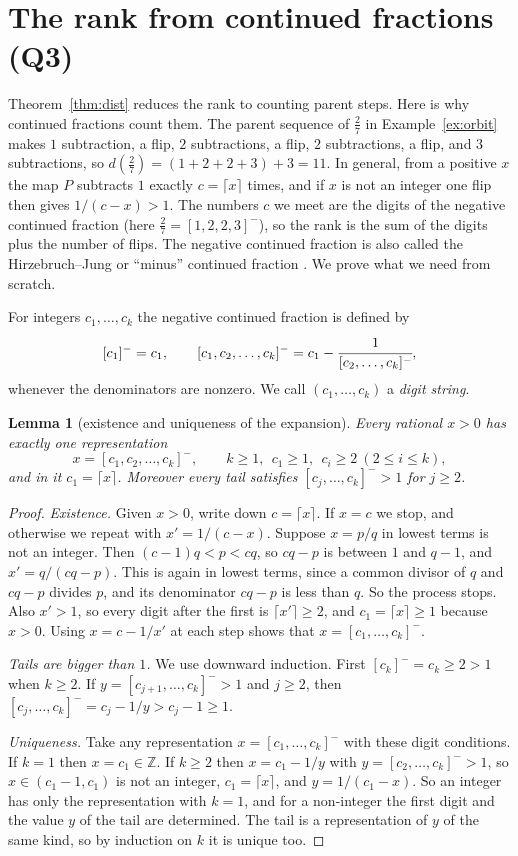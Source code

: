 \documentclass[11pt]{article}
\newtheorem{lemma}[theorem]{Lemma}
\theoremstyle{definition}
\theoremstyle{remark}
\newcommand{\Z}{\mathbb{Z}}
\newcommand{\hj}[1]{[#1]^{-}}                 %
\begin{document}
\section{The rank from continued fractions (Q3)}\label{sec:cf}

Theorem~\ref{thm:dist} reduces the rank to counting parent steps. Here is why continued fractions
count them. The parent sequence of $\tfrac27$ in Example~\ref{ex:orbit} makes $1$ subtraction, a
flip, $2$ subtractions, a flip, $2$ subtractions, a flip, and $3$ subtractions, so
$d(\tfrac27)=(1+2+2+3)+3=11$. In general, from a positive $x$ the map $P$ subtracts $1$ exactly
$c=\lceil x\rceil$ times, and if $x$ is not an integer one flip then gives $1/(c-x)>1$. The numbers
$c$ we meet are the digits of the negative continued fraction (here $\tfrac27=\hj{1,2,2,3}$), so
the rank is the sum of the digits plus the number of flips. The negative continued fraction is also
called the Hirzebruch--Jung or ``minus'' continued fraction \cite{hirzebruch1953,popescu2007}. We
prove what we need from scratch.

For integers $c_1,\dots,c_k$ the negative continued fraction is defined by
\[
\hj{c_1}=c_1, \qquad
\hj{c_1,c_2,\dots,c_k}=c_1-\cfrac{1}{\hj{c_2,\dots,c_k}} ,
\]
whenever the denominators are nonzero. We call $(c_1,\dots,c_k)$ a \emph{digit string}.

\begin{lemma}[existence and uniqueness of the expansion]\label{lem:hjexist}
Every rational $x>0$ has exactly one representation
\[
x=\hj{c_1,c_2,\dots,c_k},\qquad k\ge1,\ \ c_1\ge1,\ \ c_i\ge2\ (2\le i\le k),
\]
and in it $c_1=\lceil x\rceil$. Moreover every tail satisfies $\hj{c_j,\dots,c_k}>1$ for $j\ge2$.
\end{lemma}

\begin{proof}
\emph{Existence.} Given $x>0$, write down $c=\lceil x\rceil$. If $x=c$ we stop, and otherwise we
repeat with $x'=1/(c-x)$. Suppose $x=p/q$ in lowest terms is not an integer. Then $(c-1)q<p<cq$, so
$cq-p$ is between $1$ and $q-1$, and $x'=q/(cq-p)$. This is again in lowest terms, since a common
divisor of $q$ and $cq-p$ divides $p$, and its denominator $cq-p$ is less than $q$. So the process
stops. Also $x'>1$, so every digit after the first is $\lceil x'\rceil\ge2$, and
$c_1=\lceil x\rceil\ge1$ because $x>0$. Using $x=c-1/x'$ at each step shows that
$x=\hj{c_1,\dots,c_k}$.

\emph{Tails are bigger than $1$.} We use downward induction. First $\hj{c_k}=c_k\ge2>1$ when
$k\ge2$. If $y=\hj{c_{j+1},\dots,c_k}>1$ and $j\ge2$, then $\hj{c_j,\dots,c_k}=c_j-1/y>c_j-1\ge1$.

\emph{Uniqueness.} Take any representation $x=\hj{c_1,\dots,c_k}$ with these digit conditions. If
$k=1$ then $x=c_1\in\Z$. If $k\ge2$ then $x=c_1-1/y$ with $y=\hj{c_2,\dots,c_k}>1$, so
$x\in(c_1-1,c_1)$ is not an integer, $c_1=\lceil x\rceil$, and $y=1/(c_1-x)$. So an integer has only
the representation with $k=1$, and for a non-integer the first digit and the value $y$ of the tail
are determined. The tail is a representation of $y$ of the same kind, so by induction on $k$ it is
unique too.
\end{proof}
\end{document}
